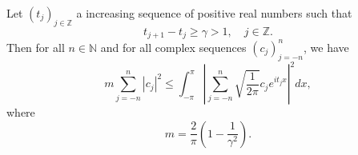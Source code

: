 \documentclass[12pt]{article}
\begin{document}
Let $(t_{j})_{j \in \mathbb{Z}}$ a increasing sequence of positive real numbers such that
\[
t_{j + 1} - t_{j} \geq \gamma > 1, \quad j \in \mathbb{Z}.
\]
Then for all $n \in \mathbb{N}$ and for all complex sequences $(c_{j})_{j = -n}^{n}$, we have
\[
m \sum_{j = -n}^{n} |c_{j}|^{2} \leq \int_{-\pi}^{\pi} \left| \sum_{j = -n}^{n} \sqrt{\frac{1}{2\pi}} c_{j}e^{i t_{j} x} \right|^{2} dx,
\]
where
\[
m = \frac{2}{\pi}\left( 1 - \frac{1}{\gamma^{2}} \right).
\]


\end{document}
